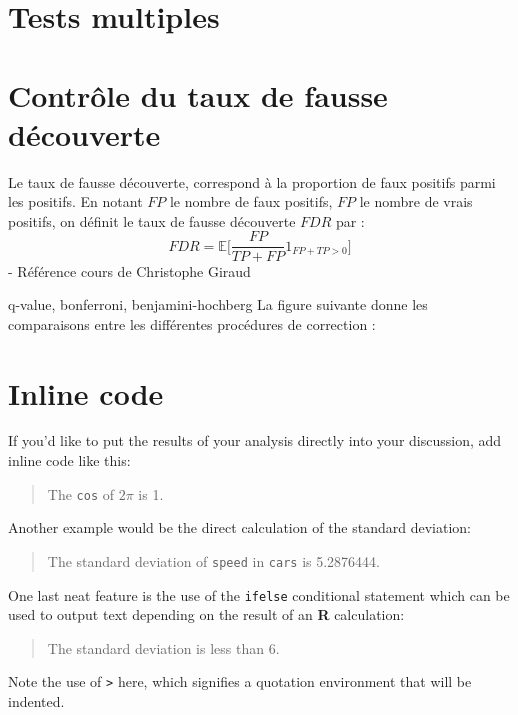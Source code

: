 \documentclass[12pt,twoside]{reedthesis}
\theoremstyle{definition}
\theoremstyle{definition}
\theoremstyle{remark}
\begin{document}
  \section{Tests multiples}\label{tests-multiples}
  
  \section{Contrôle du taux de fausse
  découverte}\label{controle-du-taux-de-fausse-decouverte}
  
  Le taux de fausse découverte, correspond à la proportion de faux
  positifs parmi les positifs. En notant \(FP\) le nombre de faux
  positifs, \(FP\) le nombre de vrais positifs, on définit le taux de
  fausse découverte \(FDR\) par :
  \[ FDR = \mathbb{E}\Big[\frac{FP}{TP + FP} 1_{FP+TP > 0}\Big] \] -
  Référence cours de Christophe Giraud
  
  q-value, bonferroni, benjamini-hochberg La figure suivante donne les
  comparaisons entre les différentes procédures de correction :
  
  \section{Inline code}\label{inline-code}
  
  If you'd like to put the results of your analysis directly into your
  discussion, add inline code like this:
  
  \begin{quote}
  The \texttt{cos} of \(2 \pi\) is 1.
  \end{quote}
  
  Another example would be the direct calculation of the standard
  deviation:
  
  \begin{quote}
  The standard deviation of \texttt{speed} in \texttt{cars} is 5.2876444.
  \end{quote}
  
  One last neat feature is the use of the \texttt{ifelse} conditional
  statement which can be used to output text depending on the result of an
  \textbf{R} calculation:
  
  \begin{quote}
  The standard deviation is less than 6.
  \end{quote}
  
  Note the use of \texttt{\textgreater{}} here, which signifies a
  quotation environment that will be indented.
  
\end{document}
